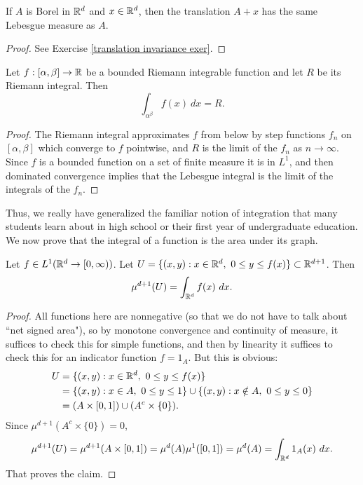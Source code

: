 \begin{theorem}
\label{translation invariance in Rd}
If $A$ is Borel in $\mathbb{R}^d$ and $x \in \mathbb{R}^d$, then the translation $A + x$ has the same Lebesgue measure as $A$.
\end{theorem}
\begin{proof}
See Exercise \ref{translation invariance exer}.
\end{proof}

\begin{theorem}
Let $f: [\alpha, \beta] \to \mathbb{R}$ be a bounded Riemann integrable function and let $R$ be its Riemann integral. Then
\[\int_{\alpha^\beta} f(x)~dx = R.\]
\end{theorem}
\begin{proof}
The Riemann integral approximates $f$ from below by step functions $f_{n}$ on $[\alpha, \beta]$ which converge to $f$ pointwise, and $R$ is the limit of the $f_{n}$ as $n \to \infty$.
Since $f$ is a bounded function on a set of finite measure it is in $L^1$, and then dominated convergence implies that the Lebesgue integral is the limit of the integrals of the $f_{n}$.
\end{proof}

Thus, we really have generalized the familiar notion of integration that many students learn about in high school or their first year of undergraduate education.
We now prove that the integral of a function is the area under its graph.

\begin{theorem}
Let $f \in L^1(\mathbb{R}^{d} \to [0, \infty))$.
Let $U = \{(x, y): x \in \mathbb{R}^d, ~0 \leq y \leq f(x)\} \subset \mathbb{R}^{d+1}$.
Then
\[\mu^{d+1}(U) = \int_{\mathbb{R}^d} f(x)~dx.\]
\end{theorem}
\begin{proof}
All functions here are nonnegative (so that we do not have to talk about ``net signed area"), so by monotone convergence and continuity of measure, it suffices to check this for simple functions, and then by linearity it suffices to check this for an indicator function $f = 1_A$.
But this is obvious:
\begin{align*}U &= \{(x, y): x \in \mathbb{R}^d, ~0 \leq y \leq f(x)\} \\&= \{(x, y): x \in A, ~0 \leq y \leq 1\} \cup \{(x, y): x \notin A, ~0 \leq y \leq 0\} \\&= (A \times [0, 1]) \cup (A^{c} \times \{0\}).\end{align*}
Since $\mu^{d+1}(A^{c} \times \{0\}) = 0$,
\[\mu^{d+1}(U) = \mu^{d+1}(A \times [0, 1]) = \mu^d(A) \mu^1([0, 1]) = \mu^d(A) = \int_{\mathbb{R}^d} 1_A(x)~dx.\]
That proves the claim.
\end{proof}

